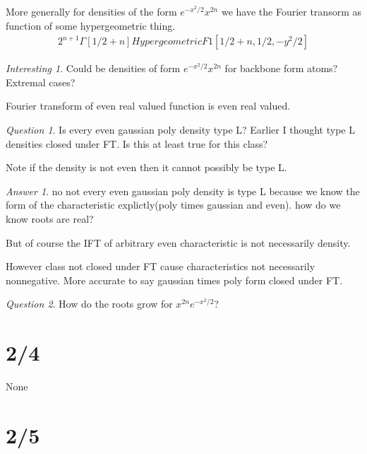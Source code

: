 \documentclass[11pt]{article}
\theoremstyle{remark}
\newtheorem*{quest}{Question}
\newtheorem*{ans}{Answer}
\newtheorem*{interest}{Interesting}
\begin{document}
\begin{remark}
	More generally for densities of the form $e^{-x^2/2}x^{2n}$ we have the Fourier transorm as function of some hypergeometric thing.
	\begin{align*}
		2^{n+1}\Gamma[1/2+n]HypergeometricF1[1/2+n,1/2,-y^2/2]
	\end{align*} 
\end{remark}

\begin{interest}
	Could be densities of form $e^{-x^2/2}x^{2n}$ for backbone form atoms? Extremal cases?
\end{interest}

\begin{remark}
	Fourier transform of even real valued function is even real valued.
\end{remark}

\begin{quest}
	Is every even gaussian poly density type L? Earlier I thought type L densities closed under FT. Is this at least true for this class?

	Note if the density is not even then it cannot possibly be type L. 
\end{quest}

\begin{ans}
	no not every even gaussian poly density is type L because we know the form of the characteristic explictly(poly times gaussian and even).  how do we know roots are real? 

	But of course the IFT of arbitrary even characteristic is not necessarily density.

	However class not closed under FT cause characteristics not necessarily nonnegative. More accurate to say gaussian times poly form closed under FT.
\end{ans}

\begin{quest}
	How do the roots grow for $x^{2n}e^{-x^2/2}$?
\end{quest}

\section{2/4}
 
None

\section{2/5}
\end{document}
